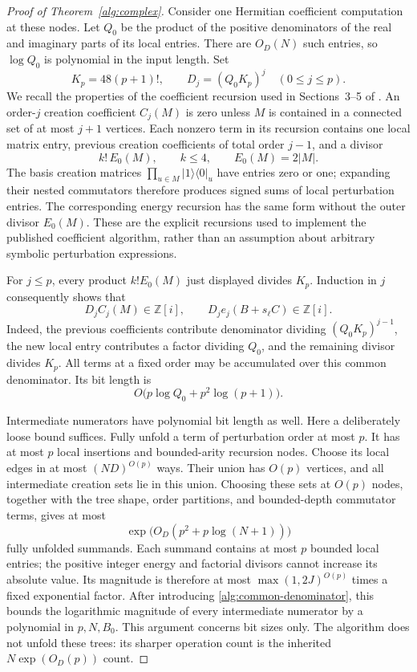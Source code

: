 \documentclass[reqno]{amsart}
\theoremstyle{definition}
\theoremstyle{remark}
\begin{document}
\begin{proof}[Proof of Theorem~\ref{alg:complex}]
Consider one Hermitian coefficient computation at these nodes.
Let \(Q_0\) be the product of the positive denominators of the
real and imaginary parts of its local entries.  There are
\(O_D(N)\) such entries, so \(\log Q_0\) is polynomial in the
input length.  Set
\begin{equation}
 K_p=48(p+1)!,\qquad
 D_j=(Q_0K_p)^j\quad(0\le j\le p).
 \label{alg:common-denominator}
\end{equation}
We recall the properties of the coefficient recursion used in
Sections~3--5 of \cite{BDL08}.  An order-\(j\) creation
coefficient \(C_j(M)\) is zero unless \(M\) is contained in a
connected set of at most \(j+1\) vertices.  Each nonzero term in
its recursion contains one local matrix entry, previous creation
coefficients of total order \(j-1\), and a divisor
\[
 k!\,E_0(M),\qquad k\le4,\qquad E_0(M)=2|M|.
 \]
The basis creation matrices
\(\prod_{u\in M}|1\rangle\langle0|_u\) have entries zero or one;
expanding their nested commutators therefore produces signed sums
of local perturbation entries.
The corresponding energy recursion has the same form without
the outer divisor \(E_0(M)\).
These are the explicit recursions used to implement the published
coefficient algorithm, rather than an assumption about arbitrary
symbolic perturbation expressions.

For \(j\le p\), every product \(k!E_0(M)\) just displayed
divides \(K_p\).  Induction in \(j\) consequently shows that
\begin{equation}
 D_j C_j(M)\in\mathbb Z[i],
 \qquad D_j e_j(B+s_\ell C)\in\mathbb Z[i].
 \label{alg:denominator-induction}
\end{equation}
Indeed, the previous coefficients contribute denominator
dividing \((Q_0K_p)^{j-1}\), the new local entry contributes
a factor dividing \(Q_0\), and the remaining divisor divides
\(K_p\).  All terms at a fixed order may be accumulated over
this common denominator.  Its bit length is
\[
 O\bigl(p\log Q_0+p^2\log(p+1)\bigr).
 \]

Intermediate numerators have polynomial bit length as well.
Here a deliberately loose bound suffices.
Fully unfold a term of perturbation order at most \(p\).
It has at most \(p\) local insertions and bounded-arity recursion
nodes.  Choose its local edges in at most \((ND)^{O(p)}\)
ways.  Their union has \(O(p)\) vertices, and all intermediate
creation sets lie in this union.  Choosing these sets at
\(O(p)\) nodes, together with the tree shape, order partitions,
and bounded-depth commutator terms, gives at most
\[
 \exp\bigl(O_D(p^2+p\log(N+1))\bigr)
 \]
fully unfolded summands.  Each summand contains at most \(p\)
bounded local entries; the positive integer energy and factorial
divisors cannot increase its absolute value.
Its magnitude is therefore at most
\(\max(1,2J)^{O(p)}\) times a fixed exponential factor.
After introducing \eqref{alg:common-denominator}, this bounds
the logarithmic magnitude of every intermediate numerator by
a polynomial in \(p,N,B_0\).
This argument concerns bit sizes only.  The algorithm does not
unfold these trees: its sharper operation count is the inherited
\(N\exp(O_D(p))\) count.


\end{proof}
\end{document}
